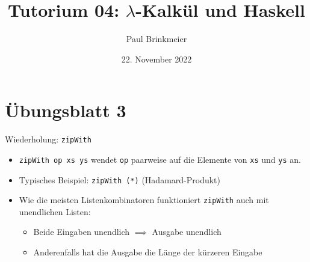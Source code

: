 \documentclass{beamer}
\title{Tutorium 04: $\lambda$-Kalkül und Haskell}
\author{Paul Brinkmeier}
\institute{Tutorium Programmierparadigmen am KIT}
\date{22. November 2022}
\begin{document}
\begin{frame}
	\titlepage
\end{frame}

\section{Übungsblatt 3}

\begin{frame}{Wiederholung: \texttt{zipWith}}

    \begin{itemize}
        \item \texttt{zipWith op xs ys} wendet \texttt{op} paarweise auf die Elemente von \texttt{xs} und \texttt{ys} an.
        \item Typisches Beispiel: \texttt{\texttt{zipWith (*)}} (Hadamard-Produkt)
        \pause
        \item Wie die meisten Listenkombinatoren funktioniert \texttt{zipWith} auch mit unendlichen Listen:
        \begin{itemize}
            \item Beide Eingaben unendlich $\implies$ Ausgabe unendlich
            \item Anderenfalls hat die Ausgabe die Länge der kürzeren Eingabe
        \end{itemize}
    \end{itemize}
\end{frame}
\end{document}
